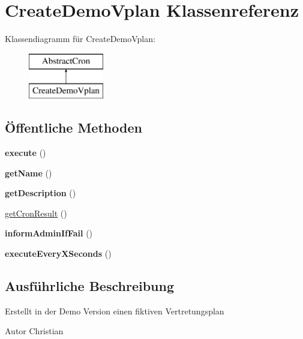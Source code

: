 \hypertarget{class_create_demo_vplan}{}\section{Create\+Demo\+Vplan Klassenreferenz}
\label{class_create_demo_vplan}
Klassendiagramm für Create\+Demo\+Vplan\+:\begin{figure}[H]
\begin{center}
\leavevmode
\includegraphics[height=2.000000cm]{class_create_demo_vplan}
\end{center}
\end{figure}
\subsection*{Öffentliche Methoden}
\begin{DoxyCompactItemize}
\item 
\mbox{\label{class_create_demo_vplan_a9a274be2e2cb4010852bfcfd40fa4866}} 
{\bfseries execute} ()
\item 
\mbox{\label{class_create_demo_vplan_ade4c2b989968fc023dd266a3a96002bf}} 
{\bfseries get\+Name} ()
\item 
\mbox{\label{class_create_demo_vplan_a57fd56a4c0c79478008ac950deda11cc}} 
{\bfseries get\+Description} ()
\item 
\mbox{\hyperlink{class_create_demo_vplan_a5aee66a7a529e1b727f60ce1d34583d6}{get\+Cron\+Result}} ()
\item 
\mbox{\label{class_create_demo_vplan_af7427da42c5b461e46ea8d1a83997f70}} 
{\bfseries inform\+Admin\+If\+Fail} ()
\item 
\mbox{\label{class_create_demo_vplan_ad4013f72ab5b0bcfb5731106273ebac2}} 
{\bfseries execute\+Every\+X\+Seconds} ()
\end{DoxyCompactItemize}


\subsection{Ausführliche Beschreibung}
Erstellt in der Demo Version einen fiktiven Vertretungsplan \begin{DoxyAuthor}{Autor}
Christian 
\end{DoxyAuthor}


